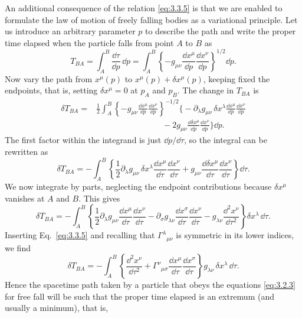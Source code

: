 An additional consequence of the relation \eqref{eq:3.3.5} is that we are
enabled to formulate the law of motion of freely falling bodies as a
variational principle. Let us introduce an arbitrary parameter $p$ to
describe the path and write the proper time elapsed when the particle falls
from point $A$ to $B$ as
\[
  T_{BA}=\int_A^B\frac{\dd\tau}{\dd p}\,\dd p
  =\int_A^B\left\{
  -g_{\mu\nu}\frac{\dd x^\mu}{\dd p}
  \frac{\dd x^\nu}{\dd p}\right\}^{1/2}\dd p.
\]
Now vary the path from $x^\mu(p)$ to $x^\mu(p)+\delta x^\mu(p)$, keeping
fixed the endpoints, that is, setting $\delta x^\mu=0$ at $p_A$ and $p_B$.
The change in $T_{BA}$ is
\[
  \begin{aligned}
  \delta T_{BA}
  ={}&\frac12\int_A^B
  \left\{-g_{\mu\nu}\frac{\dd x^\mu}{\dd p}
  \frac{\dd x^\nu}{\dd p}\right\}^{-1/2}
  \Biggl\{-\partial_\lambda g_{\mu\nu}\,\delta x^\lambda
  \frac{\dd x^\mu}{\dd p}\frac{\dd x^\nu}{\dd p}
  \\
  &\hspace{8em}
  -2g_{\mu\nu}\frac{\dd\delta x^\mu}{\dd p}
  \frac{\dd x^\nu}{\dd p}\Biggr\}\dd p.
  \end{aligned}
\]
The first factor within the integrand is just $\dd p/\dd\tau$, so the
integral can be rewritten as
\[
  \delta T_{BA}
  =-\int_A^B\left\{
  \frac12\partial_\lambda g_{\mu\nu}\,\delta x^\lambda
  \frac{\dd x^\mu}{\dd\tau}\frac{\dd x^\nu}{\dd\tau}
  +g_{\mu\nu}\frac{\dd\delta x^\mu}{\dd\tau}
  \frac{\dd x^\nu}{\dd\tau}\right\}\dd\tau.
\]
We now integrate by parts, neglecting the endpoint contributions because
$\delta x^\mu$ vanishes at $A$ and $B$. This gives
\[
  \delta T_{BA}
  =-\int_A^B\left\{
  \frac12\partial_\lambda g_{\mu\nu}
  \frac{\dd x^\mu}{\dd\tau}\frac{\dd x^\nu}{\dd\tau}
  -\partial_\sigma g_{\lambda\nu}
  \frac{\dd x^\sigma}{\dd\tau}\frac{\dd x^\nu}{\dd\tau}
  -g_{\lambda\nu}\frac{\dd^2x^\nu}{\dd\tau^2}
  \right\}\delta x^\lambda\,\dd\tau.
\]
Inserting Eq.~\eqref{eq:3.3.5} and recalling that
$\Gamma^\lambda{}_{\mu\nu}$ is symmetric in its lower indices, we find
\begin{equation}
  \delta T_{BA}
  =-\int_A^B\left\{
  \frac{\dd^2x^\nu}{\dd\tau^2}
  +\Gamma^\nu{}_{\mu\sigma}
  \frac{\dd x^\mu}{\dd\tau}\frac{\dd x^\sigma}{\dd\tau}
  \right\}g_{\lambda\nu}\,\delta x^\lambda\,\dd\tau.
  \tag{3.3.10}\label{eq:3.3.10}
\end{equation}
Hence the spacetime path taken by a particle that obeys the equations
\eqref{eq:3.2.3} for free fall will be such that the proper time elapsed is
an extremum (and usually a minimum), that is,
